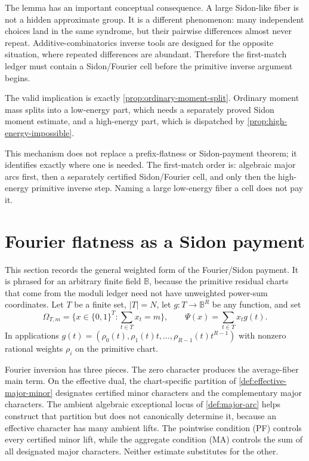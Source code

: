 \documentclass[12pt,a4paper]{amsart}
\numberwithin{equation}{section}
\theoremstyle{remark}
\newcommand{\B}{\mathbb B}
\newcommand{\abs}[1]{\lvert #1\rvert}
\begin{document}
The lemma has an important conceptual consequence.  A large Sidon-like fiber is not a hidden approximate group.  It is a different phenomenon: many independent choices land in the same syndrome, but their pairwise differences almost never repeat.  Additive-combinatorics inverse tools are designed for the opposite situation, where repeated differences are abundant.  Therefore the first-match ledger must contain a Sidon/Fourier cell before the primitive inverse argument begins.

The valid implication is exactly \cref{prop:ordinary-moment-split}.  Ordinary
moment mass splits into a low-energy part, which needs a separately proved
Sidon moment estimate, and a high-energy part, which is dispatched by
\cref{prop:high-energy-impossible}.

This mechanism does not replace a prefix-flatness or Sidon-payment theorem;
it identifies exactly where one is needed.  The first-match order is:
algebraic major arcs first, then a separately certified Sidon/Fourier cell,
and only then the high-energy primitive inverse step.  Naming a large
low-energy fiber a cell does not pay it.

\section{Fourier flatness as a Sidon payment}\label{sec:fourier}\label{sec:sidon-closure}

This section records the general weighted form of the Fourier/Sidon payment.  It is phrased for an arbitrary finite field \(\B\), because the primitive residual charts that come from the moduli ledger need not have unweighted power-sum coordinates.  Let \(T\) be a finite set, \(\abs T=N\), let \(g:T\to\B^R\) be any function, and set
\[
        \Omega_{T,m}=\{x\in\{0,1\}^T: \sum_{t\in T}x_t=m\},
        \qquad
        \Psi(x)=\sum_{t\in T}x_tg(t).
\]
In applications \(g(t)=(\rho_0(t),\rho_1(t)t,\ldots,\rho_{R-1}(t)t^{R-1})\) with nonzero rational weights \(\rho_i\) on the primitive chart.

Fourier inversion has three pieces.  The zero character produces the
average-fiber main term.  On the effective dual, the chart-specific
partition of \cref{def:effective-major-minor} designates certified minor
characters and the complementary major characters.  The ambient algebraic
exceptional locus of \cref{def:major-arc} helps construct that partition
but does not canonically determine it, because an effective character has
many ambient lifts.  The pointwise condition \textup{(PF)} controls every
certified minor lift, while the aggregate condition \textup{(MA)} controls
the sum of all designated major characters.  Neither estimate substitutes
for the other.
\end{document}
